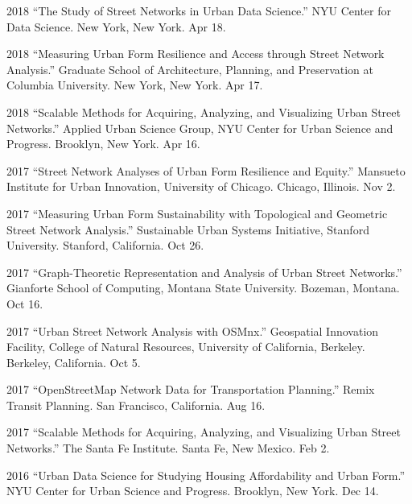 \documentclass{academiccv}
\begin{document}
\begin{tablist}

\item[2018] \tab \enquote{The Study of Street Networks in Urban Data Science.} NYU Center for Data Science. New York, New York. Apr 18.

\item[2018] \tab \enquote{Measuring Urban Form Resilience and Access through Street Network Analysis.} Graduate School of Architecture, Planning, and Preservation at Columbia University. New York, New York. Apr 17.

\item[2018] \tab \enquote{Scalable Methods for Acquiring, Analyzing, and Visualizing Urban Street Networks.} Applied Urban Science Group, NYU Center for Urban Science and Progress. Brooklyn, New York. Apr 16.

\item[2017] \tab \enquote{Street Network Analyses of Urban Form Resilience and Equity.} Mansueto Institute for Urban Innovation, University of Chicago. Chicago, Illinois. Nov 2.

\item[2017] \tab \enquote{Measuring Urban Form Sustainability with Topological and Geometric Street Network Analysis.} Sustainable Urban Systems Initiative, Stanford University. Stanford, California. Oct 26.

\item[2017] \tab \enquote{Graph-Theoretic Representation and Analysis of Urban Street Networks.} Gianforte School of Computing, Montana State University. Bozeman, Montana. Oct 16.

\item[2017] \tab \enquote{Urban Street Network Analysis with OSMnx.} Geospatial Innovation Facility, College of Natural Resources, University of California, Berkeley. Berkeley, California. Oct 5.

\item[2017] \tab \enquote{OpenStreetMap Network Data for Transportation Planning.} Remix Transit Planning. San Francisco, California. Aug 16.

\item[2017] \tab \enquote{Scalable Methods for Acquiring, Analyzing, and Visualizing Urban Street Networks.} The Santa Fe Institute. Santa Fe, New Mexico. Feb 2.

\item[2016] \tab \enquote{Urban Data Science for Studying Housing Affordability and Urban Form.} NYU Center for Urban Science and Progress. Brooklyn, New York. Dec 14.


\end{tablist}
\end{document}

